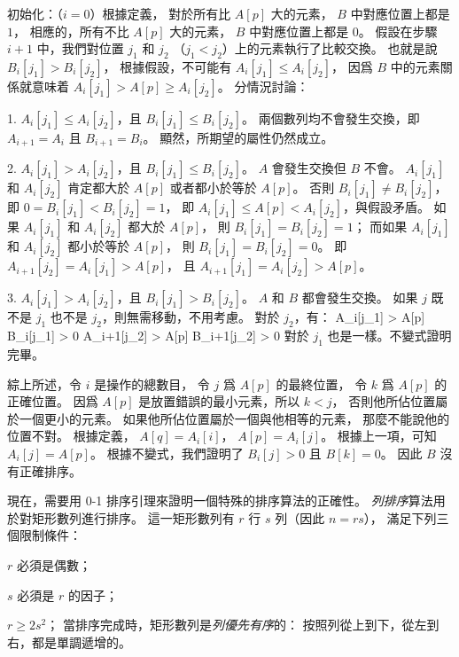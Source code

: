 初始化：（$i=0$）根據定義，
對於所有比 $A[p]$ 大的元素， $B$ 中對應位置上都是 $1$，
相應的，所有不比 $A[p]$ 大的元素， $B$ 中對應位置上都是 $0$。
假設在步驟 $i+1$ 中，我們對位置 $j_1$ 和 $j_2$ （$j_1<j_2$）上的元素執行了比較交換。
也就是說 $B_i[j_1]>B_i[j_2]$，
根據假設，不可能有 $A_i[j_1]\le A_i[j_2]$，
因爲 $B$ 中的元素關係就意味着 $A_i[j_1]>A[p]\ge A_i[j_2]$。
分情況討論：

1. $A_i[j_1]\le A_i[j_2]$，且 $B_i[j_1]\le B_i[j_2]$。
兩個數列均不會發生交換，即 $A_{i+1}=A_i$ 且 $B_{i+1}=B_i$。
顯然，所期望的屬性仍然成立。

2. $A_i[j_1]> A_i[j_2]$，且 $B_i[j_1]\le B_i[j_2]$。
 $A$ 會發生交換但 $B$ 不會。
 $A_i[j_1]$ 和 $A_i[j_2]$ 肯定都大於 $A[p]$ 或者都小於等於 $A[p]$。
否則 $B_i[j_1]\ne B_i[j_2]$，
即 $0=B_i[j_1]<B_i[j_2]=1$，
即 $A_i[j_1]\le A[p]<A_i[j_2]$，與假設矛盾。
如果 $A_i[j_1]$ 和 $A_i[j_2]$ 都大於 $A[p]$，
則 $B_i[j_1]=B_i[j_2]=1$；
而如果 $A_i[j_1]$ 和 $A_i[j_2]$ 都小於等於 $A[p]$，
則 $B_i[j_1]=B_i[j_2]=0$。
即 $A_{i+1}[j_2]=A_i[j_1] > A[p]$，
且 $A_{i+1}[j_1]=A_i[j_2] > A[p]$。

3. $A_i[j_1]> A_i[j_2]$，且 $B_i[j_1]> B_i[j_2]$。
 $A$ 和 $B$ 都會發生交換。
如果 $j$ 既不是 $j_1$ 也不是 $j_2$，則無需移動，不用考慮。
對於 $j_2$，有：
\startsplitformula\startmathalignment[n=3,align={right,middle,left}]
\NC A_i[j_1] > A[p] \NC \Leftrightarrow \NC B_i[j_1] > 0 \NR
\NC A_{i+1}[j_2] > A[p] \NC \Leftrightarrow \NC B_{i+1}[j_2] > 0 \NR
\stopmathalignment\stopsplitformula
對於 $j_1$ 也是一樣。不變式證明完畢。

綜上所述，令 $i$ 是操作的總數目，
令 $j$ 爲 $A[p]$ 的最終位置，
令 $k$ 爲 $A[p]$ 的正確位置。
因爲 $A[p]$ 是放置錯誤的最小元素，所以 $k<j$，
否則他所佔位置屬於一個更小的元素。
如果他所佔位置屬於一個與他相等的元素，
那麼不能說他的位置不對。
根據定義， $A[q]=A_i[i]$， $A[p]=A_i[j]$。
根據上一項，可知 $A_i[j]=A[p]$。
根據不變式，我們證明了 $B_i[j]>0$ 且 $B[k]=0$。
因此 $B$ 沒有正確排序。
\stopANSWER

現在，需要用 0-1 排序引理來證明一個特殊的排序算法的正確性。
\emph{列排序}算法用於對矩形數列進行排序。
這一矩形數列有 $r$ 行 $s$ 列（因此 $n=rs$），
滿足下列三個限制條件：
\startigNum[2]
\item $r$ 必須是偶數；
\item $s$ 必須是 $r$ 的因子；
\item $r\ge 2s^2$；
\stopigNum
當排序完成時，矩形數列是\emph{列優先有序}的：
按照列從上到下，從左到右，都是單調遞增的。


